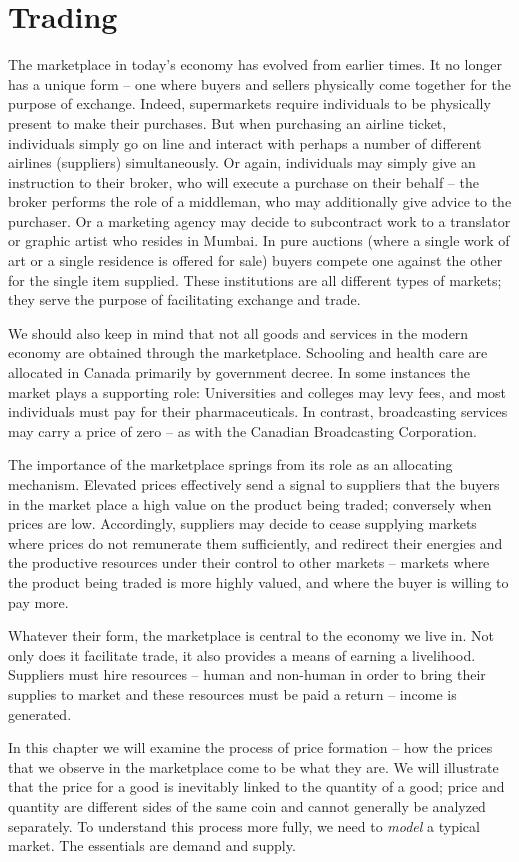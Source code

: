 \section{Trading}\label{sec:ch3sec1}
The marketplace in today's economy has evolved from earlier times. It no longer has a unique form -- one where buyers and sellers physically come together for the purpose of exchange. Indeed, supermarkets require individuals to be physically present to make their purchases. But when purchasing an airline ticket, individuals simply go on line and interact with perhaps a number of different airlines (suppliers) simultaneously. Or again, individuals may simply give an instruction to their broker, who will execute a purchase on their behalf -- the broker performs the role of a middleman, who may additionally give advice to the purchaser. Or a marketing agency may decide to subcontract work to a translator or graphic artist who resides in Mumbai. In pure auctions (where a single work of art or a single residence is offered for sale) buyers compete one against the other for the single item supplied. These institutions are all different types of markets; they serve the purpose of facilitating exchange and trade. 

We should also keep in mind that not all goods and services in the modern economy are obtained through the marketplace. Schooling and health care are allocated in Canada primarily by government decree. In some instances the market plays a supporting role: Universities and colleges may levy fees, and most individuals must pay for their pharmaceuticals. In contrast, broadcasting services may carry a price of zero -- as with the Canadian Broadcasting Corporation.

The importance of the marketplace springs from its role as an allocating mechanism. Elevated prices effectively send a signal to suppliers that the buyers in the market place a high value on the product being traded; conversely when prices are low. Accordingly, suppliers may decide to cease supplying markets where prices do not remunerate them sufficiently, and redirect their energies and the productive resources under their control to other markets -- markets where the product being traded is more highly valued, and where the buyer is willing to pay more.

Whatever their form, the marketplace is central to the economy we live in. Not only does it facilitate trade, it also provides a means of earning a livelihood. Suppliers must hire resources -- human and non-human in order to bring their supplies to market and these resources must be paid a return -- income is generated. 

In this chapter we will examine the process of price formation -- how the prices that we observe in the marketplace come to be what they are. We will illustrate that the price for a good is inevitably linked to the quantity of a good; price and quantity are different sides of the same coin and cannot generally be analyzed separately. To understand this process more fully, we need to \textit{model} a typical market. The essentials are demand and supply.
